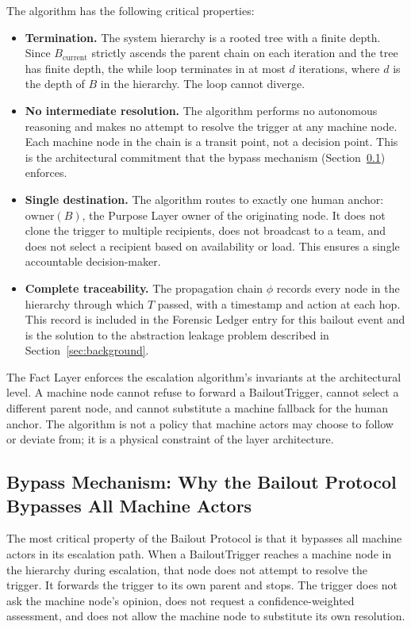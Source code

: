 \documentclass[12pt]{article}
\begin{document}
\bigskip

The algorithm has the following critical properties:

\begin{itemize}\setlength\itemsep{0.25em}
\item \textbf{Termination.} The system hierarchy is a rooted tree with a finite depth. Since $B_{\text{current}}$ strictly ascends the parent chain on each iteration and the tree has finite depth, the while loop terminates in at most $d$ iterations, where $d$ is the depth of $B$ in the hierarchy. The loop cannot diverge.
\item \textbf{No intermediate resolution.} The algorithm performs no autonomous reasoning and makes no attempt to resolve the trigger at any machine node. Each machine node in the chain is a transit point, not a decision point. This is the architectural commitment that the bypass mechanism (Section~\ref{sec:bypass-mechanism}) enforces.
\item \textbf{Single destination.} The algorithm routes to exactly one human anchor: $\text{owner}(B)$, the Purpose Layer owner of the originating node. It does not clone the trigger to multiple recipients, does not broadcast to a team, and does not select a recipient based on availability or load. This ensures a single accountable decision-maker.
\item \textbf{Complete traceability.} The propagation chain $\phi$ records every node in the hierarchy through which $T$ passed, with a timestamp and action at each hop. This record is included in the Forensic Ledger entry for this bailout event and is the solution to the abstraction leakage problem described in Section~\ref{sec:background}.
\end{itemize}

The Fact Layer enforces the escalation algorithm's invariants at the architectural level. A machine node cannot refuse to forward a BailoutTrigger, cannot select a different parent node, and cannot substitute a machine fallback for the human anchor. The algorithm is not a policy that machine actors may choose to follow or deviate from; it is a physical constraint of the layer architecture.

\subsection{Bypass Mechanism: Why the Bailout Protocol Bypasses All Machine Actors}
\label{sec:bypass-mechanism}

The most critical property of the Bailout Protocol is that it bypasses all machine actors in its escalation path. When a BailoutTrigger reaches a machine node in the hierarchy during escalation, that node does not attempt to resolve the trigger. It forwards the trigger to its own parent and stops. The trigger does not ask the machine node's opinion, does not request a confidence-weighted assessment, and does not allow the machine node to substitute its own resolution.
\end{document}
